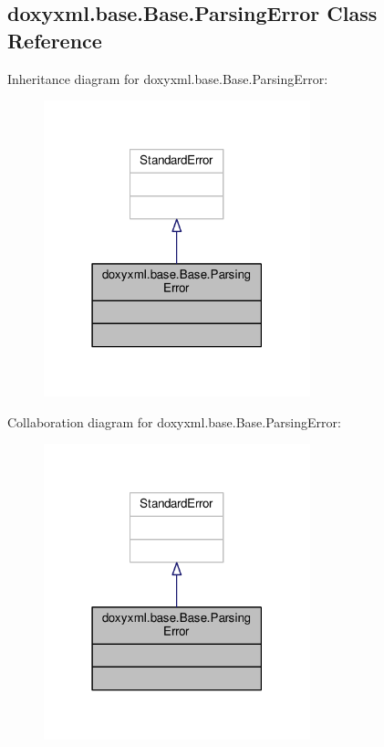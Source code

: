 \subsection{doxyxml.\+base.\+Base.\+Parsing\+Error Class Reference}
\label{classdoxyxml_1_1base_1_1Base_1_1ParsingError}


Inheritance diagram for doxyxml.\+base.\+Base.\+Parsing\+Error\+:
\nopagebreak
\begin{figure}[H]
\begin{center}
\leavevmode
\includegraphics[width=219pt]{d1/d11/classdoxyxml_1_1base_1_1Base_1_1ParsingError__inherit__graph}
\end{center}
\end{figure}


Collaboration diagram for doxyxml.\+base.\+Base.\+Parsing\+Error\+:
\nopagebreak
\begin{figure}[H]
\begin{center}
\leavevmode
\includegraphics[width=219pt]{da/daa/classdoxyxml_1_1base_1_1Base_1_1ParsingError__coll__graph}
\end{center}
\end{figure}


